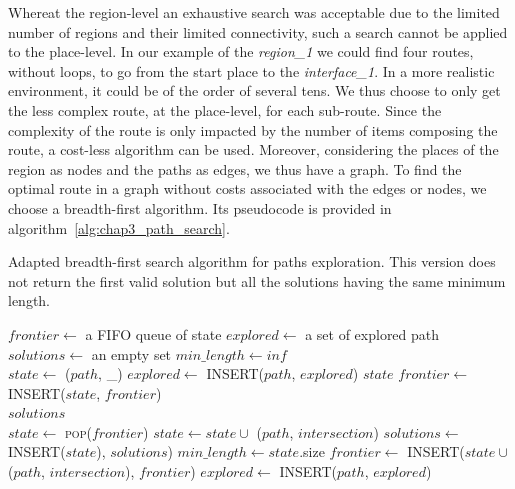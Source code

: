 Whereat the region-level an exhaustive search was acceptable due to the limited number of regions and their limited connectivity, such a search cannot be applied to the place-level. In our example of the \textit{region\_1} we could find four routes, without loops, to go from the start place to the \textit{interface\_1}. In a more realistic environment, it could be of the order of several tens. We thus choose to only get the less complex route, at the place-level, for each sub-route. Since the complexity of the route is only impacted by the number of items composing the route, a cost-less algorithm can be used. Moreover, considering the places of the region as nodes and the paths as edges, we thus have a graph. To find the optimal route in a graph without costs associated with the edges or nodes, we choose a breadth-first algorithm. Its pseudocode is provided in algorithm~\ref{alg:chap3_path_search}.

\begin{algorithm}[ht!]
\caption{Adapted breadth-first search algorithm for paths exploration. This version does not return the first valid solution but all the solutions having the same minimum length.}
\label{alg:chap3_path_search}
\begin{algorithmic}[1]
    \State $frontier\leftarrow$ a FIFO queue of state
    \State $explored\leftarrow$ a set of explored path
    \State $solutions\leftarrow$ an empty set
    \State $min\_length \leftarrow inf$ 
    \\
    	\State $state \leftarrow$ ($path$, \_) 
    	\State $explored\leftarrow$ \textsc{INSERT}($path$, $explored$)
    		\State \Return $state$
    	\Else
    		\State $frontier\leftarrow$ \textsc{INSERT}($state$, $frontier$)
    	\EndIf
    \EndFor
    \\
    \Loop
        	\State \Return $solutions$
        \EndIf
        \\
        \State $state\leftarrow$ \textsc{pop}($frontier$)
        			\State $state \leftarrow state \cup$ ($path$, $intersection$)
        				\State $solutions\leftarrow$ \textsc{INSERT}($state$), $solutions$)
        				\State $min\_length \leftarrow state$.size
        			\EndIf
        			\State $frontier\leftarrow$ \textsc{INSERT}($state \cup$ ($path$, $intersection$), $frontier$)
        			\State $explored\leftarrow$ \textsc{INSERT}($path$, $explored$)
        		\EndIf
        	\EndFor
        \EndFor
    \EndLoop
\EndFunction
\end{algorithmic}
\end{algorithm}

